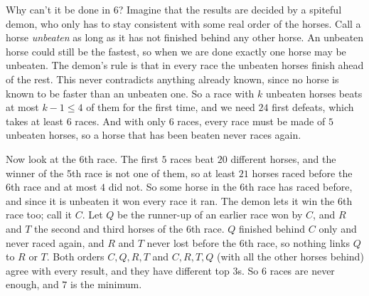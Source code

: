 Why can't it be done in $6$? Imagine that the results are decided by a spiteful demon, who only has to stay
consistent with some real order of the horses. Call a horse \emph{unbeaten} as long as it has not finished
behind any other horse. An unbeaten horse could still be the fastest, so when we are done exactly one horse
may be unbeaten. The demon's rule is that in every race the unbeaten horses finish ahead of the rest. This
never contradicts anything already known, since no horse is known to be faster than an unbeaten one. So a
race with $k$ unbeaten horses beats at most $k-1\le4$ of them for the first time, and we need $24$ first
defeats, which takes at least $6$ races. And with only $6$ races, every race must be made of $5$ unbeaten
horses, so a horse that has been beaten never races again.

Now look at the 6th race. The first $5$ races beat $20$ different horses, and the winner of the 5th race is
not one of them, so at least $21$ horses raced before the 6th race and at most $4$ did not. So some horse in
the 6th race has raced before, and since it is unbeaten it won every race it ran. The demon lets it win the
6th race too; call it $C$. Let $Q$ be the runner-up of an earlier race won by $C$, and $R$ and $T$ the second
and third horses of the 6th race. $Q$ finished behind $C$ only and never raced again, and $R$ and $T$ never
lost before the 6th race, so nothing links $Q$ to $R$ or $T$. Both orders $C,Q,R,T$ and $C,R,T,Q$ (with all
the other horses behind) agree with every result, and they have different top $3$s. So $6$ races are never
enough, and $7$ is the minimum.
